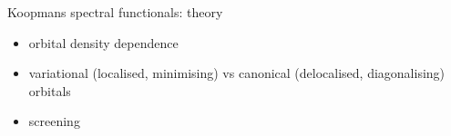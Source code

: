 \documentclass[xcolor=table,aspectratio=169]{beamer}
\numberwithin{equation}{section}
\begin{document}
\begin{frame}{Koopmans spectral functionals: theory}
   \vspace{-1ex}
   \begin{itemize}
      \item<2-> orbital density dependence
      \item<4-> variational (localised, minimising) vs canonical (delocalised, diagonalising) orbitals
      \item<5-> screening
   \end{itemize}
   \begin{overlayarea}{\textwidth}{0.4\textheight}
\end{overlayarea}
\end{frame}
\end{document}
